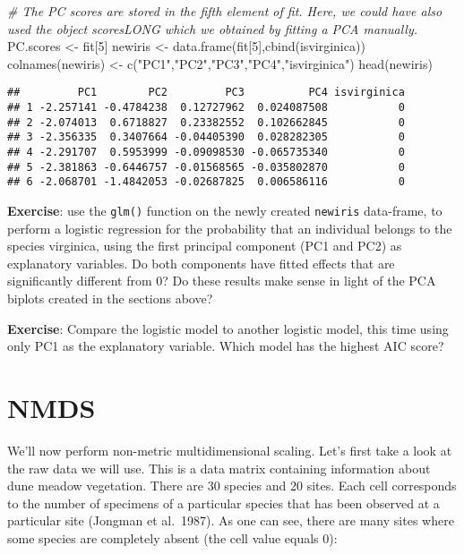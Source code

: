 \documentclass[
]{book}
\newenvironment{Shaded}{\begin{snugshade}}{\end{snugshade}}
\newcommand{\CommentTok}[1]{\textcolor[rgb]{0.56,0.35,0.01}{\textit{#1}}}
\newcommand{\DecValTok}[1]{\textcolor[rgb]{0.00,0.00,0.81}{#1}}
\newcommand{\FunctionTok}[1]{\textcolor[rgb]{0.00,0.00,0.00}{#1}}
\newcommand{\NormalTok}[1]{#1}
\newcommand{\OtherTok}[1]{\textcolor[rgb]{0.56,0.35,0.01}{#1}}
\newcommand{\StringTok}[1]{\textcolor[rgb]{0.31,0.60,0.02}{#1}}
\begin{document}
\begin{Shaded}
\begin{Highlighting}[]
\CommentTok{\# The PC scores are stored in the fifth element of fit. Here, we could have also used the object scoresLONG which we obtained by fitting a PCA manually.}
\NormalTok{PC.scores }\OtherTok{\textless{}{-}}\NormalTok{ fit[}\DecValTok{5}\NormalTok{] }
\NormalTok{newiris }\OtherTok{\textless{}{-}} \FunctionTok{data.frame}\NormalTok{(fit[}\DecValTok{5}\NormalTok{],}\FunctionTok{cbind}\NormalTok{(isvirginica))}
\FunctionTok{colnames}\NormalTok{(newiris) }\OtherTok{\textless{}{-}} \FunctionTok{c}\NormalTok{(}\StringTok{"PC1"}\NormalTok{,}\StringTok{"PC2"}\NormalTok{,}\StringTok{"PC3"}\NormalTok{,}\StringTok{"PC4"}\NormalTok{,}\StringTok{"isvirginica"}\NormalTok{)}
\FunctionTok{head}\NormalTok{(newiris)}
\end{Highlighting}
\end{Shaded}

\begin{verbatim}
##         PC1        PC2         PC3          PC4 isvirginica
## 1 -2.257141 -0.4784238  0.12727962  0.024087508           0
## 2 -2.074013  0.6718827  0.23382552  0.102662845           0
## 3 -2.356335  0.3407664 -0.04405390  0.028282305           0
## 4 -2.291707  0.5953999 -0.09098530 -0.065735340           0
## 5 -2.381863 -0.6446757 -0.01568565 -0.035802870           0
## 6 -2.068701 -1.4842053 -0.02687825  0.006586116           0
\end{verbatim}

\textbf{Exercise}: use the \texttt{glm()} function on the newly created \texttt{newiris} data-frame, to perform a logistic regression for the probability that an individual belongs to the species virginica, using the first principal component (PC1 and PC2) as explanatory variables. Do both components have fitted effects that are significantly different from 0? Do these results make sense in light of the PCA biplots created in the sections above?

\textbf{Exercise}: Compare the logistic model to another logistic model, this time using only PC1 as the explanatory variable. Which model has the highest AIC score?

\hypertarget{nmds}{%
\section{NMDS}\label{nmds}}

We'll now perform non-metric multidimensional scaling. Let's first take a look at the raw data we will use. This is a data matrix containing information about dune meadow vegetation. There are 30 species and 20 sites. Each cell corresponds to the number of specimens of a particular species that has been observed at a particular site (Jongman et al.~1987). As one can see, there are many sites where some species are completely absent (the cell value equals 0):
\end{document}
